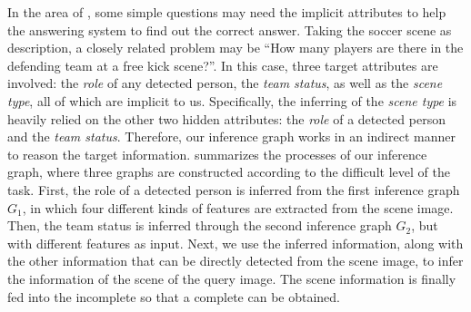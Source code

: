 In the area of \vqa, some simple questions may need the implicit attributes to help the answering system to find out the correct answer. 
Taking the soccer scene as description,
a closely related problem may be ``How many players are there in the defending team at a free kick scene?''. 
In this case, three target attributes are involved: the \emph{role} of any detected person, the \emph{team status}, as well as the \emph{scene type}, all of which are implicit to us. 
Specifically, the inferring of the \emph{scene type} is heavily relied on the other two hidden attributes: the \emph{role} of a detected person and the \emph{team status}. 
Therefore, our inference graph works in an indirect manner to reason the target information.
 summarizes the processes of our inference graph, where three graphs are constructed according to the difficult level of the task. First, the role of a detected person is inferred from the first inference graph $G_1$, in which four different kinds of features are extracted from the scene image. Then, the team status is inferred through the second inference graph $G_2$, but with different features as input. Next, we use the inferred information, along with the other information that can be directly detected from the scene image, to infer the information of the scene of the query image.
The scene information is finally fed into the incomplete  so that a complete  can be obtained. 
